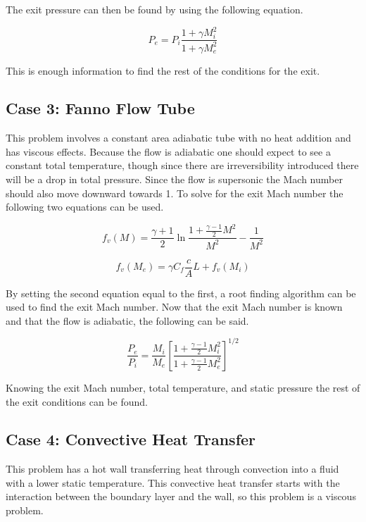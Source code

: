 \documentclass[conf]{new-aiaa}
\begin{document}
\noindent The exit pressure can then be found by using the following equation.

\begin{equation}
    P_e = P_i \frac{1+\gamma M_i^2}{1+\gamma M_e^2} 
\end{equation}

\noindent This is enough information to find the rest of the conditions for the exit.

\subsection*{Case 3: Fanno Flow Tube}
This problem involves a constant area adiabatic tube with no heat addition and has viscous effects.
Because the flow is adiabatic one should expect to see a constant total temperature, though since there are irreversibility introduced there will be a drop in total pressure.
Since the flow is supersonic the Mach number should also move downward towards 1. To solve for the exit Mach number the following two equations can be used.

\begin{equation}
    f_v (M) = \frac{\gamma+1}{2} \ln{\frac{1+\frac{\gamma-1}{2} M^2}{M^2}} - \frac{1}{M^2}
\end{equation}

\begin{equation}
    f_v (M_e) = \gamma C_f \frac{c}{A} L + f_v (M_i)
\end{equation}

By setting the second equation equal to the first, a root finding algorithm can be used to find the exit Mach number.
Now that the exit Mach number is known and that the flow is adiabatic, the following can be said.

\begin{equation}
    \frac{P_e}{P_i} = \frac{M_i}{M_e} \left[\frac{1+\frac{\gamma-1}{2}M^2_i}{1+\frac{\gamma-1}{2}M^2_e}\right]^{1/2}
\end{equation}

\noindent Knowing the exit Mach number, total temperature, and static pressure the rest of the exit conditions can be found.


\subsection*{Case 4: Convective Heat Transfer}

This problem has a hot wall transferring heat through convection into a fluid with a lower static temperature.
This convective heat transfer starts with the interaction between the boundary layer and the wall, so this problem is a viscous problem.
\end{document}
